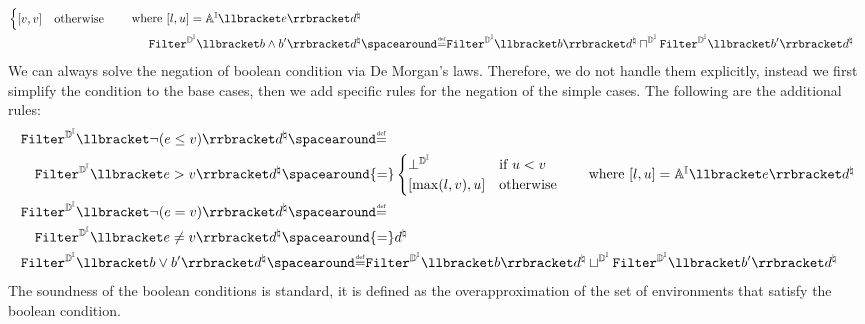 \begin{description}
\begin{align*}
\begin{cases}
      \interval{\defvalue}{\defvalue} & \text{otherwise}
    \end{cases} \tag*{where $\interval{l}{u} = \intervalaexp \semanticsof{\defaexp} \defabstractvalue$} \\
    \intervalabstractdomainfilter \semanticsof{\defbexp \land \defbexp'} \defabstractvalue &\DefeQ \intervalabstractdomainfilter \semanticsof{\defbexp} \defabstractvalue \intervalabstractdomainmeet \intervalabstractdomainfilter \semanticsof{\defbexp'} \defabstractvalue
  \end{align*}
  We can always solve the negation of boolean condition via De Morgan's laws.
  Therefore, we do not handle them explicitly, instead we first simplify the condition to the base cases, then we add specific rules for the negation of the simple cases. The following are the additional rules:
  \begin{align*}
    &\intervalabstractdomainfilter \semanticsof{\neg(\defaexp \le \defvalue)} \defabstractvalue \DefeQ \\
    &\quad\intervalabstractdomainfilter \semanticsof{\defaexp > \defvalue} \defabstractvalue \spacearound{=}\begin{cases}
      \intervalabstractdomainbottom & \text{if } u < \defvalue \\
      \interval{\max(l, \defvalue)}{u} & \text{otherwise}
    \end{cases} \tag*{where $\interval{l}{u} = \intervalaexp \semanticsof{\defaexp} \defabstractvalue$} \\
    &\intervalabstractdomainfilter \semanticsof{\neg(\defaexp = \defvalue)} \defabstractvalue \DefeQ \\
    &\quad\intervalabstractdomainfilter \semanticsof{\defaexp \neq \defvalue} \defabstractvalue \spacearound{=} \defabstractvalue \\
    &\intervalabstractdomainfilter \semanticsof{\defbexp \lor \defbexp'} \defabstractvalue \DefeQ \intervalabstractdomainfilter \semanticsof{\defbexp} \defabstractvalue \intervalabstractdomainjoin \intervalabstractdomainfilter \semanticsof{\defbexp'} \defabstractvalue
  \end{align*}
  The soundness of the boolean conditions is standard, it is defined as the overapproximation of the set of environments that satisfy the boolean condition.

\end{description}
